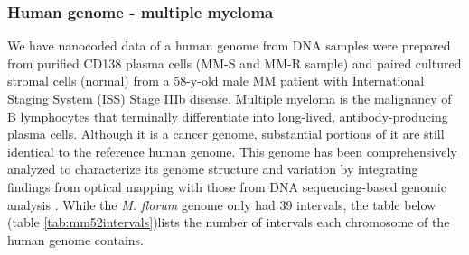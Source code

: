 \subsubsection{Human genome - multiple myeloma}
We have nanocoded data of a human genome from DNA samples were prepared from purified CD138 plasma cells (MM-S and MM-R sample) and paired cultured stromal cells (normal) from a 58-y-old male MM patient with International Staging System (ISS) Stage IIIb disease. Multiple myeloma is the malignancy of B lymphocytes that terminally differentiate into long-lived, antibody-producing plasma cells. Although it is a cancer genome, substantial portions of it are still identical to the reference human genome. This genome has been comprehensively analyzed to characterize its genome structure and variation by integrating findings from optical mapping with those from DNA sequencing-based genomic analysis \cite{Gupta_etal_2015_PNAS}. While the {\emph{M. florum}} genome only had 39 intervals, the table below (table \ref{tab:mm52intervals})lists the number of intervals each chromosome of the human genome contains.

